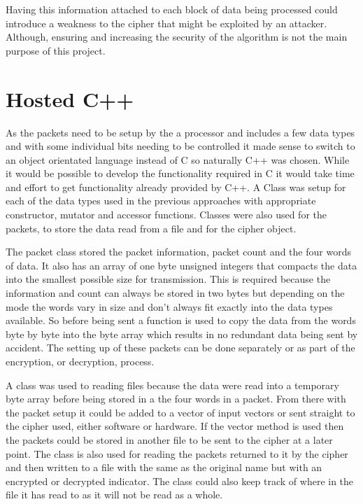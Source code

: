 \documentclass[12pt,twoside,a4paper]{report}
\begin{document}
	Having this information attached to each block of data being processed could introduce a weakness to the cipher that might be exploited by an attacker. Although, ensuring and increasing the security of the algorithm is not the main purpose of this project.
    
	\section{Hosted C++}
	\label{section:HOSTEDF}
	
	As the packets need to be setup by the a processor and includes a few data types and with some individual bits needing to be controlled it made sense to switch to an object orientated language instead of C so naturally C++ was chosen. While it would be possible to develop the functionality required in C it would take time and effort to get functionality already provided by C++. A Class was setup for each of the data types used in the previous approaches with appropriate constructor, mutator and accessor functions. Classes were also used for the packets, to store the data read from a file and for the cipher object.
    
   	The packet class stored the packet information, packet count and the four words of data. It also has an array of one byte unsigned integers that compacts the data into the smallest possible size for transmission. This is required because the information and count can always be stored in two bytes but depending on the mode the words vary in size and don't always fit exactly into the data types available. So before being sent a function is used to copy the data from the words byte by byte into the byte array which results in no redundant data being sent by accident. The setting up of these packets can be done separately or as part of the encryption, or decryption, process.
   	
   	A class was used to reading files because the data were read into a temporary byte array before being stored in a the four words in a packet. From there with the packet setup it could be added to a vector of input vectors or sent straight to the cipher used, either software or hardware. If the vector method is used then the packets could be stored in another file to be sent to the cipher at a later point. The class is also used for reading the packets returned to it by the cipher and then written to a file with the same as the original name but with an encrypted or decrypted indicator. The class could also keep track of where in the file it has read to as it will not be read as a whole.
   	
\end{document}
